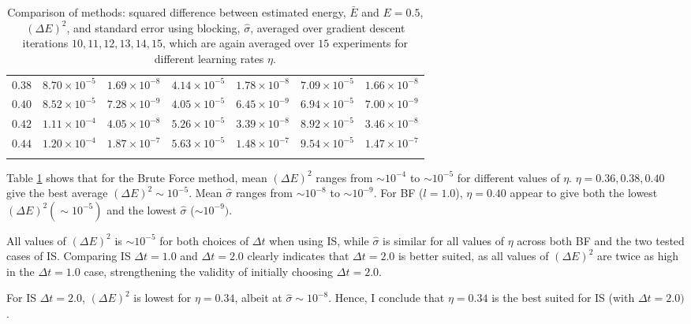 \documentclass[%
oneside,                 %
final,                   %
10pt]{article}
\begin{document}
\begin{table}[h!]
\begin{center}
\begin{tabular}{l|l|l|l|l|l|l}
$ 0.38 $ &  $ 8.70\times 10^{-5 } $ & $ 1.69\times 10^{-8 } $ & $ 4.14\times 10^{-5 } $ & $ 1.78\times 10^{-8 } $ & $ 7.09\times 10^{-5 } $ & $ 1.66\times 10^{-8 } $  \\
$ 0.40 $ &  $ 8.52\times 10^{-5 } $ & $ 7.28\times 10^{-9 } $ & $ 4.05\times 10^{-5 } $ & $ 6.45\times 10^{-9 } $ & $ 6.94\times 10^{-5 } $ & $ 7.00\times 10^{-9 } $  \\
$ 0.42 $ &  $ 1.11\times 10^{-4 } $ & $ 4.05\times 10^{-8 } $ & $ 5.26\times 10^{-5 } $ & $ 3.39\times 10^{-8 } $ & $ 8.92\times 10^{-5 } $ & $ 3.46\times 10^{-8 } $  \\
$ 0.44 $ &  $ 1.20\times 10^{-4 } $ & $ 1.87\times 10^{-7 } $ & $ 5.63\times 10^{-5 } $ & $ 1.48\times 10^{-7 } $ & $ 9.54\times 10^{-5 } $ & $ 1.47\times 10^{-7 } $  \\
  \\
 \hline
\end{tabular}
\end{center}
\caption{Comparison of methods: squared difference between estimated energy, $\bar E$ and $E=0.5$, $(\Delta E)^2$, and standard error using blocking, $\hat \sigma$, averaged over gradient descent iterations $10,11,12,13,14,15$, which are again averaged over $15$ experiments for different learning rates $\eta$.}
\label{table:BF_IS_eta}
\end{table}

Table \ref{table:BF_IS_eta} shows that for the Brute Force method, mean $(\Delta E)^2$ ranges from $\sim 10^{-4}$ to $\sim 10^{-5}$ for different values of $\eta$. $\eta=0.36,0.38, 0.40$ give the best average $(\Delta E)^2 \sim 10^{-5}$. Mean $\hat \sigma$ ranges from $\sim 10^{-8}$ to $\sim 10^{-9}$. For BF ($l=1.0$), $\eta=0.40$ appear to give both the lowest $(\Delta E)^2 (\sim 10^{-5})$ and the lowest $\hat \sigma$ ($\sim 10^{-9})$. 

All values of  $(\Delta E)^2$ is $\sim 10^{-5}$ for both choices of $\Delta t$ when using IS, while $\hat \sigma$ is similar for all values of $\eta$ across both BF and the two tested cases of IS. 
Comparing IS $\Delta t=1.0$ and $\Delta t=2.0$ clearly indicates that $\Delta t=2.0$ is better suited, as all values of $(\Delta E)^2$ are twice as high in the $\Delta t=1.0$ case, strengthening the validity of initially choosing $\Delta t=2.0$.

For IS $\Delta t=2.0$, $(\Delta E)^2$ is lowest for $\eta=0.34$, albeit at $\hat \sigma\sim 10^{-8}$. Hence, I conclude that $\eta = 0.34$ is the best suited for IS (with $\Delta t=2.0)$.
\end{document}
